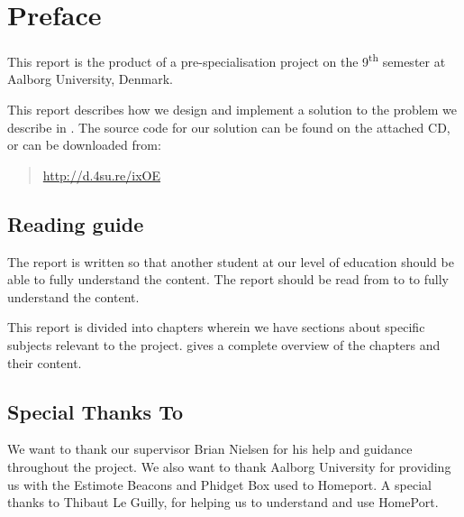 \section*{Preface}\label{sec:preface}
This report is the product of a pre-specialisation project on the 9\textsuperscript{th} semester at Aalborg University, Denmark. 

This report describes how we design and implement a solution to the problem we describe in . 
The source code for our solution can be found on the attached CD, or can be downloaded from:
\begin{quote}
  \url{http://d.4su.re/ixOE}
\end{quote}

\subsection*{Reading guide}
The report is written so that another student at our level of education should be able to fully understand the content. The report should be read from  to  to fully understand the content. 

This report is divided into chapters wherein we have sections about specific subjects relevant to the project.  gives a complete overview of the chapters and their content.

\subsection*{Special Thanks To}
We want to thank our supervisor Brian Nielsen for his help and guidance throughout the project. We also want to thank Aalborg University for providing us with the Estimote Beacons and Phidget Box used to Homeport. A special thanks to Thibaut Le Guilly, for helping us to understand and use HomePort. 

